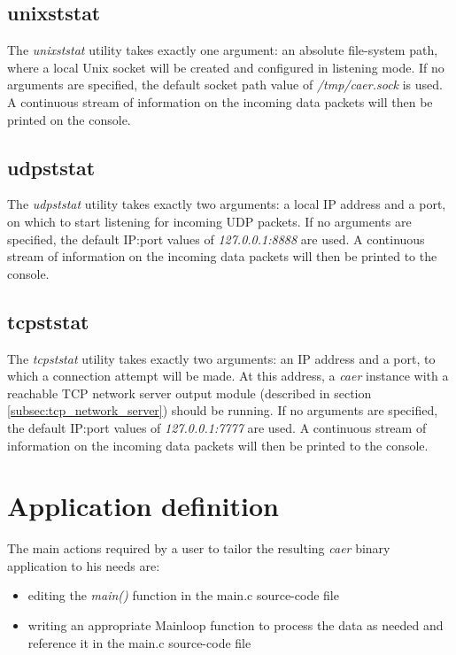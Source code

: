 \documentclass[a4paper,12pt]{report}
\begin{document}
\subsection{unixststat} \label{subsec:unixststat}

The \emph{unixststat} utility takes exactly one argument: an absolute file-system path, where a local Unix socket will be created and configured in listening mode.
If no arguments are specified, the default socket path value of \emph{/tmp/caer.sock} is used.
A continuous stream of information on the incoming data packets will then be printed on the console.

\subsection{udpststat} \label{subsec:udpststat}

The \emph{udpststat} utility takes exactly two arguments: a local IP address and a port, on which to start listening for incoming UDP packets.
If no arguments are specified, the default IP:port values of \emph{127.0.0.1:8888} are used.
A continuous stream of information on the incoming data packets will then be printed to the console.

\subsection{tcpststat} \label{subsec:tcpststat}

The \emph{tcpststat} utility takes exactly two arguments: an IP address and a port, to which a connection attempt will be made. At this address, a \emph{caer} instance with a reachable TCP network server output module (described in section \ref{subsec:tcp_network_server}) should be running.
If no arguments are specified, the default IP:port values of \emph{127.0.0.1:7777} are used.
A continuous stream of information on the incoming data packets will then be printed to the console.

\section{Application definition} \label{sec:application_definition}

The main actions required by a user to tailor the resulting \emph{caer} binary application to his needs are:
\begin{itemize}
\item editing the \emph{main()} function in the main.c source-code file
\item writing an appropriate Mainloop function to process the data as needed and reference it in the main.c source-code file
\end{itemize}
\end{document}
